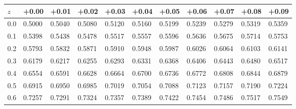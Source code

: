 \begin{tabular}{l|llllllllll}
\toprule
$z$ &                      +0.00 &                      +0.01 &                      +0.02 &                      +0.03 &                      +0.04 &                      +0.05 &                      +0.06 &                      +0.07 &                      +0.08 &                      +0.09 \\
\midrule
0.0 &  \cellcolor{gray!20}0.5000 &  \cellcolor{gray!20}0.5040 &  \cellcolor{gray!20}0.5080 &  \cellcolor{gray!20}0.5120 &  \cellcolor{gray!20}0.5160 &  \cellcolor{gray!20}0.5199 &  \cellcolor{gray!20}0.5239 &  \cellcolor{gray!20}0.5279 &  \cellcolor{gray!20}0.5319 &  \cellcolor{gray!20}0.5359 \\
0.1 &                     0.5398 &                     0.5438 &                     0.5478 &                     0.5517 &                     0.5557 &                     0.5596 &                     0.5636 &                     0.5675 &                     0.5714 &                     0.5753 \\
0.2 &  \cellcolor{gray!20}0.5793 &  \cellcolor{gray!20}0.5832 &  \cellcolor{gray!20}0.5871 &  \cellcolor{gray!20}0.5910 &  \cellcolor{gray!20}0.5948 &  \cellcolor{gray!20}0.5987 &  \cellcolor{gray!20}0.6026 &  \cellcolor{gray!20}0.6064 &  \cellcolor{gray!20}0.6103 &  \cellcolor{gray!20}0.6141 \\
0.3 &                     0.6179 &                     0.6217 &                     0.6255 &                     0.6293 &                     0.6331 &                     0.6368 &                     0.6406 &                     0.6443 &                     0.6480 &                     0.6517 \\
0.4 &  \cellcolor{gray!20}0.6554 &  \cellcolor{gray!20}0.6591 &  \cellcolor{gray!20}0.6628 &  \cellcolor{gray!20}0.6664 &  \cellcolor{gray!20}0.6700 &  \cellcolor{gray!20}0.6736 &  \cellcolor{gray!20}0.6772 &  \cellcolor{gray!20}0.6808 &  \cellcolor{gray!20}0.6844 &  \cellcolor{gray!20}0.6879 \\
0.5 &                     0.6915 &                     0.6950 &                     0.6985 &                     0.7019 &                     0.7054 &                     0.7088 &                     0.7123 &                     0.7157 &                     0.7190 &                     0.7224 \\
0.6 &  \cellcolor{gray!20}0.7257 &  \cellcolor{gray!20}0.7291 &  \cellcolor{gray!20}0.7324 &  \cellcolor{gray!20}0.7357 &  \cellcolor{gray!20}0.7389 &  \cellcolor{gray!20}0.7422 &  \cellcolor{gray!20}0.7454 &  \cellcolor{gray!20}0.7486 &  \cellcolor{gray!20}0.7517 &  \cellcolor{gray!20}0.7549 \\

\end{tabular}
